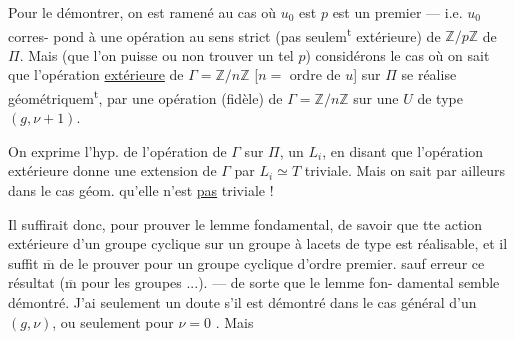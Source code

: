 Pour le démontrer, on est ramené au
cas où $u_0$ est  
$p$ est un  premier --- i.e. $u_0$ corres-
pond à une opération au sens strict
(pas seulem\textsuperscript{t} extérieure) de $\mathbb Z/p\mathbb Z$  
de $\Pi$. Mais (que l'on puisse ou non
trouver un tel $p$) considérons le cas où
on sait que l'opération \uline{extérieure} de
$\Gamma=\mathbb Z/n\mathbb Z$ [$n=$ ordre de $u$] sur $\Pi$ se réalise
géométriquem\textsuperscript{t}, par une opération (fidèle)
de $\Gamma=\mathbb Z/n\mathbb Z$ sur une $U$ de type $(g,\nu+1)$.



On exprime l'hyp. de l'opération  de $\Gamma$ sur
$\Pi$,   un $L_i$, en disant que
l'opération extérieure donne une extension
de $\Gamma$ par $L_i\simeq T$ triviale. Mais on sait
par ailleurs dans le cas géom.  qu'elle
n'est \uline{pas} triviale !

Il suffirait donc,  pour prouver le
lemme fondamental, de savoir que tte
action extérieure \inserted{[fidèle]} d'un groupe cyclique
sur un groupe à lacets de type 
est réalisable, et il suffit $\overline{\mathrm m}$ de le prouver
pour un groupe cyclique d'ordre
premier.  sauf erreur ce résultat
   ($\overline{\mathrm m}$ pour les groupes 
 ...). --- de sorte que le lemme fon-
damental semble démontré. J'ai seulement
un doute s'il est démontré dans le
cas général d'un $(g,\nu)$,  ou seulement
pour $\nu=0$ . Mais 

